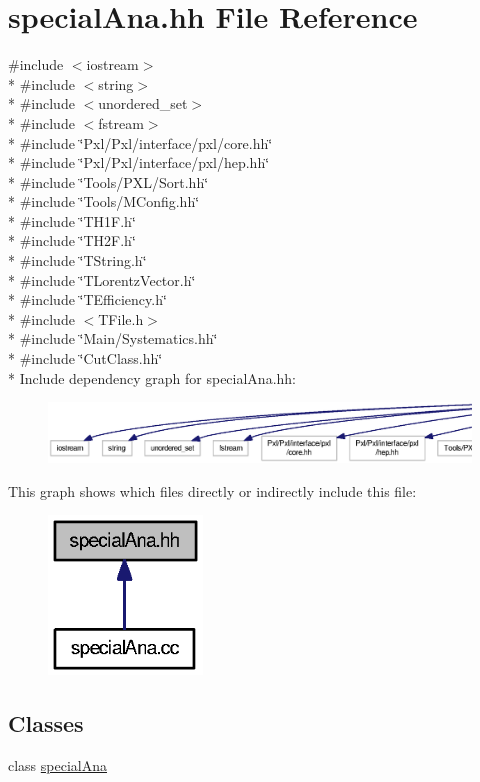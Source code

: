 \section{special\-Ana.\-hh File Reference}
\label{specialAna_8hh}
{\ttfamily \#include $<$iostream$>$}\\*
{\ttfamily \#include $<$string$>$}\\*
{\ttfamily \#include $<$unordered\-\_\-set$>$}\\*
{\ttfamily \#include $<$fstream$>$}\\*
{\ttfamily \#include \char`\"{}Pxl/\-Pxl/interface/pxl/core.\-hh\char`\"{}}\\*
{\ttfamily \#include \char`\"{}Pxl/\-Pxl/interface/pxl/hep.\-hh\char`\"{}}\\*
{\ttfamily \#include \char`\"{}Tools/\-P\-X\-L/\-Sort.\-hh\char`\"{}}\\*
{\ttfamily \#include \char`\"{}Tools/\-M\-Config.\-hh\char`\"{}}\\*
{\ttfamily \#include \char`\"{}T\-H1\-F.\-h\char`\"{}}\\*
{\ttfamily \#include \char`\"{}T\-H2\-F.\-h\char`\"{}}\\*
{\ttfamily \#include \char`\"{}T\-String.\-h\char`\"{}}\\*
{\ttfamily \#include \char`\"{}T\-Lorentz\-Vector.\-h\char`\"{}}\\*
{\ttfamily \#include \char`\"{}T\-Efficiency.\-h\char`\"{}}\\*
{\ttfamily \#include $<$T\-File.\-h$>$}\\*
{\ttfamily \#include \char`\"{}Main/\-Systematics.\-hh\char`\"{}}\\*
{\ttfamily \#include \char`\"{}Cut\-Class.\-hh\char`\"{}}\\*
Include dependency graph for special\-Ana.\-hh\-:\nopagebreak
\begin{figure}[H]
\begin{center}
\leavevmode
\includegraphics[width=350pt]{specialAna_8hh__incl}
\end{center}
\end{figure}
This graph shows which files directly or indirectly include this file\-:\nopagebreak
\begin{figure}[H]
\begin{center}
\leavevmode
\includegraphics[width=116pt]{specialAna_8hh__dep__incl}
\end{center}
\end{figure}
\subsection*{Classes}
\begin{DoxyCompactItemize}
\item 
class \hyperlink{classspecialAna}{special\-Ana}
\end{DoxyCompactItemize}
